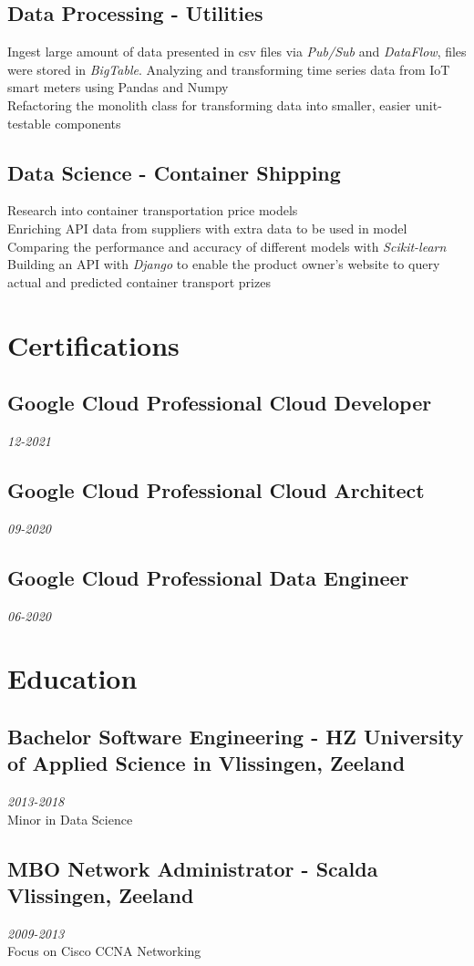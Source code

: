 \documentclass{article}
\begin{document}
\subsection{Data Processing - Utilities}
Ingest large amount of data presented in csv files via \emph{Pub/Sub} and \emph{DataFlow}, files were stored in \emph{BigTable}.
Analyzing and transforming time series data from IoT smart meters using Pandas and Numpy \\
Refactoring the monolith class for transforming data into smaller, easier unit-testable components \\

\subsection{Data Science - Container Shipping}
Research into container transportation price models \\
Enriching API data from suppliers with extra data to be used in model \\
Comparing the performance and accuracy of different models with \emph{Scikit-learn} \\
Building an API with \emph{Django} to enable the product owner's website to query actual and predicted container transport prizes \\

\clearpage

\section{Certifications}
\subsection{Google Cloud Professional Cloud Developer}\hfill {\em 12-2021} \\
\subsection{Google Cloud Professional Cloud Architect}\hfill {\em 09-2020} \\
\subsection{Google Cloud Professional Data Engineer}\hfill {\em 06-2020} \\


\section{Education}
\subsection{Bachelor Software Engineering - HZ University of Applied Science in Vlissingen, Zeeland}\hfill {\em 2013-2018} \\
Minor in Data Science
\subsection{MBO Network Administrator - Scalda Vlissingen, Zeeland}\hfill {\em 2009-2013} \\
Focus on Cisco CCNA Networking
\end{document}
